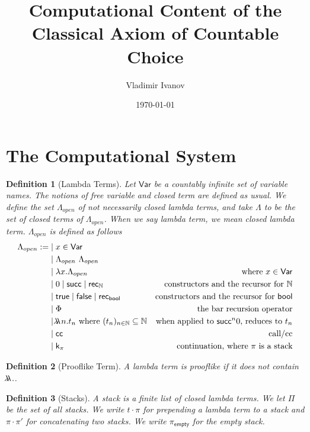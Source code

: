 \documentclass{article}
\title{Computational Content of the Classical Axiom of Countable Choice}
\author{Vladimir Ivanov}
\date{\today}
\newcommand{\successor}{\mathsf{succ}}
\newcommand{\N}{\mathbb{N}}
\newcommand{\recN}{\mathsf{rec}_{\mathbb{N}}}
\newcommand{\bool}{\mathsf{bool}}
\newcommand{\true}{\mathsf{true}}
\newcommand{\false}{\mathsf{false}}
\newcommand{\recbool}{\mathsf{rec_{bool}}}
\newcommand{\emptystack}{\pi_\mathsf{empty}}
\newcommand{\oracle}[2]{\lambda\mkern-15mu\lambda\ #1. #2}
\newcommand{\cc}{\mathsf{cc}}
\newcommand{\cont}{\mathsf{k}}
\newtheorem{definition}{Definition}
\begin{document}
    
\maketitle

\section{The Computational System}

\begin{definition}[Lambda Terms]
    Let $\mathsf{Var}$ be a countably infinite set of variable names.
    The notions of free variable and closed term are defined as usual.
    We define the set $\Lambda_{open}$ of not necessarily closed lambda terms, and take $\Lambda$ to be the set of closed terms of $\Lambda_{open}$. When we say lambda term, we mean closed lambda term. $\Lambda_{open}$ is defined as follows
    \begin{align*}
        \Lambda_{open} := & \mid x \in \mathsf{Var} \\
        & \mid \Lambda_{open}\ \Lambda_{open} \\
        & \mid \lambda x. \Lambda_{open} & \text{where $x \in \mathsf{Var}$} \\
        & \mid 0 \mid \successor \mid \recN & \text{constructors and the recursor for $\N$}\\
        & \mid \true \mid \false \mid \recbool & \text{constructors and the recursor for $\bool$}\\
        & \mid \Phi & \text{the bar recursion operator} \\
        & \mid \oracle{n}{t_n} \text{ where $(t_n)_{n \in \N} \subseteq \N$} & \text{when applied to $\successor^n 0$, reduces to $t_n$} \\
        & \mid \cc & \text{call/cc} \\
        & \mid \cont_\pi & \text{continuation, where $\pi$ is a stack}
    \end{align*}
\end{definition}

\begin{definition}[Prooflike Term]
    A lambda term is prooflike if it does not contain $\oracle{}{}$.
\end{definition}

\begin{definition}[Stacks]
    A stack is a finite list of closed lambda terms.
    We let $\Pi$ be the set of all stacks.
    We write $t \cdot \pi$ for prepending a lambda term to a stack and $\pi \cdot \pi'$ for concatenating two stacks. We write $\emptystack$ for the empty stack.
\end{definition}
\end{document}
